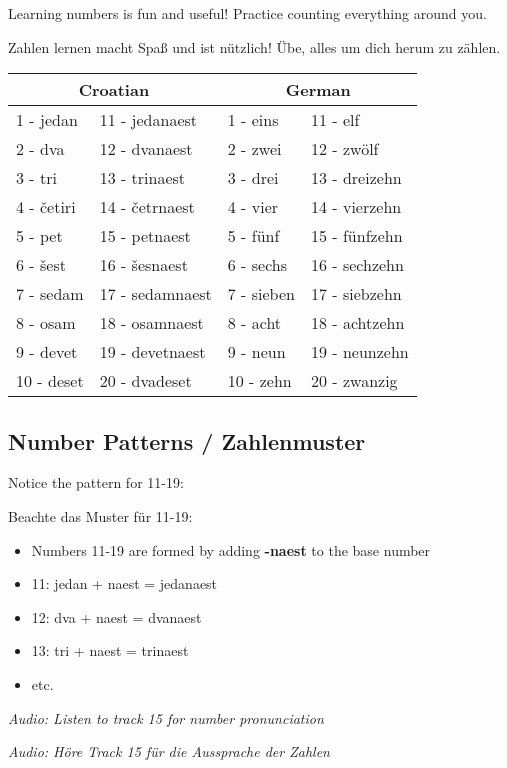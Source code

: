 \begin{vocabulary}
Learning numbers is fun and useful! Practice counting everything around you.

Zahlen lernen macht Spaß und ist nützlich! Übe, alles um dich herum zu zählen.

\begin{center}
\begin{tabular}{llll}
\toprule
\multicolumn{2}{c}{Croatian} & \multicolumn{2}{c}{German} \\
\midrule
1 - jedan & 11 - jedanaest & 1 - eins & 11 - elf \\
2 - dva & 12 - dvanaest & 2 - zwei & 12 - zwölf \\
3 - tri & 13 - trinaest & 3 - drei & 13 - dreizehn \\
4 - četiri & 14 - četrnaest & 4 - vier & 14 - vierzehn \\
5 - pet & 15 - petnaest & 5 - fünf & 15 - fünfzehn \\
6 - šest & 16 - šesnaest & 6 - sechs & 16 - sechzehn \\
7 - sedam & 17 - sedamnaest & 7 - sieben & 17 - siebzehn \\
8 - osam & 18 - osamnaest & 8 - acht & 18 - achtzehn \\
9 - devet & 19 - devetnaest & 9 - neun & 19 - neunzehn \\
10 - deset & 20 - dvadeset & 10 - zehn & 20 - zwanzig \\
\bottomrule
\end{tabular}
\end{center}

\subsection*{Number Patterns / Zahlenmuster}

Notice the pattern for 11-19:

Beachte das Muster für 11-19:

\begin{itemize}
    \item Numbers 11-19 are formed by adding \textbf{-naest} to the base number
    \item 11: jedan + naest = jedanaest
    \item 12: dva + naest = dvanaest
    \item 13: tri + naest = trinaest
    \item etc.
\end{itemize}

\textit{Audio: Listen to track 15 for number pronunciation}

\textit{Audio: Höre Track 15 für die Aussprache der Zahlen}
\end{vocabulary}


